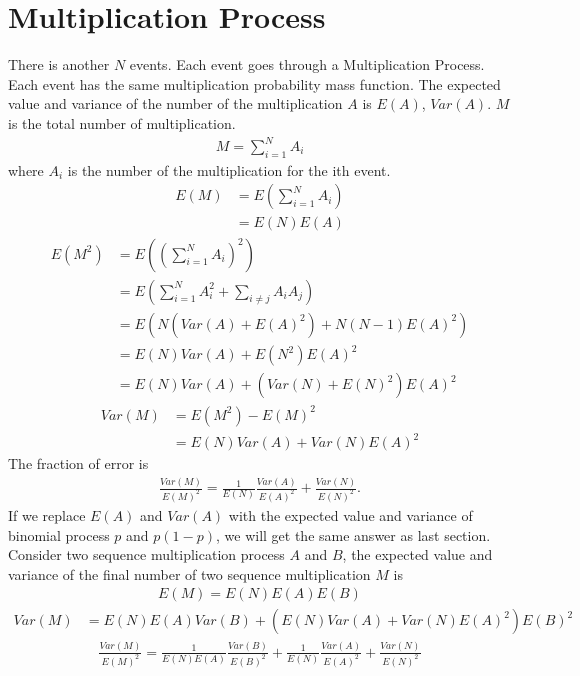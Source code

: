 \section{Multiplication Process}
There is another $N$ events. Each event goes through a Multiplication Process. Each event has the same multiplication probability mass function. The expected value and variance of the number of the multiplication $A$ is $E(A)$, $Var(A)$. $M$ is the total number of multiplication.  
\begin{align}
M = \sum_{i=1}^{N} A_i
\end{align}
where $A_i$ is the number of the multiplication for the ith event. 
\begin{align}
E(M) & = E(\sum_{i=1}^{N} A_i) \\
     & = E(N) E(A)
\end{align}
\begin{align}
E(M^2) & = E((\sum_{i=1}^{N} A_i)^2) \\
       & = E( \sum_{i=1}^{N} A_i^2 + \sum_{i\neq j} A_i A_j) \\
       & = E( N (Var(A) + E(A)^2) + N(N-1)E(A)^2) \\
       & = E(N)Var(A)+ E(N^2) E(A)^2 \\
       & = E(N)Var(A) + (Var(N)+E(N)^2) E(A)^2 
\end{align}
\begin{align}
Var(M) & = E(M^2)-E(M)^2 \\
       & = E(N)Var(A) + Var(N) E(A)^2
\end{align}
The fraction of error is
\begin{align}
\frac{Var(M)}{E(M)^2} = \frac{1}{E(N)}\frac{Var(A)}{E(A)^2}+ \frac{Var(N)}{E(N)^2}.
\end{align}
If we replace $E(A)$ and $Var(A)$ with the expected value and variance of binomial process $p$ and $p(1-p)$, we will get the same answer as last section. 
Consider two sequence multiplication process $A$ and $B$, the expected value and variance of the final number of two sequence multiplication $M$ is
\begin{align}
E(M) = E(N)E(A)E(B)
\end{align}
\begin{align}
Var(M) & = E(N)E(A)Var(B)+(E(N)Var(A)+Var(N)E(A)^2)E(B)^2
\end{align}
\begin{align}
\frac{Var(M)}{E(M)^2} = \frac{1}{E(N)E(A)}\frac{Var(B)}{E(B)^2}
+\frac{1}{E(N)}\frac{Var(A)}{E(A)^2}
+\frac{Var(N)}{E(N)^2}
\end{align}
